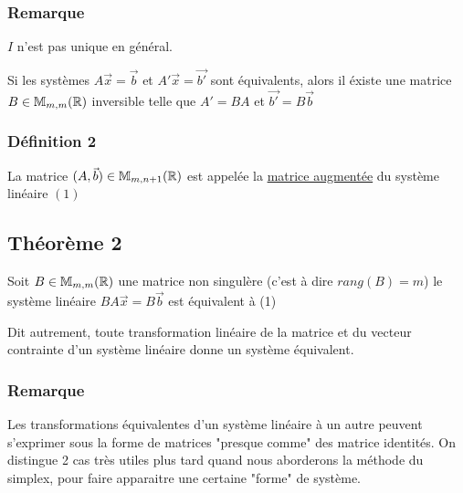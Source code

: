 \documentclass[a4paper, 11pt]{article}
\begin{document}
\subsubsection{Remarque}
$I$ n'est pas unique en général.

Si les systèmes $A\vec{x} = \vec{b}$ et $A'\vec{x} = \vec{b'}$ sont équivalents, alors il éxiste une matrice $B \in \mathbb{M}_{m,m}(\mathbb{R})$ inversible
telle que $A' = BA$ et $\vec{b'} = B\vec{b}$

\subsubsection{Définition 2}

La matrice $(A,\vec{b}) \in \mathbb{M}_{m,n+1}(\mathbb{R})$ est appelée la \underline{matrice augmentée} du système linéaire $(1)$

\subsection{Théorème 2}

Soit $B \in \mathbb{M}_{m,m}(\mathbb{R})$ une matrice non singulère (c'est à dire $rang(B) = m$)
le système linéaire $BA\vec{x} = B\vec{b}$ est équivalent à (1)

Dit autrement, toute transformation linéaire de la matrice et du vecteur contrainte d'un système linéaire
donne un système équivalent.

\subsubsection{Remarque}


Les transformations équivalentes d'un système linéaire à un autre peuvent s'exprimer sous la forme
de matrices "presque comme" des matrice identités. On distingue 2 cas très utiles plus tard quand
nous aborderons la méthode du simplex, pour faire apparaitre une certaine "forme" de système.
\end{document}
